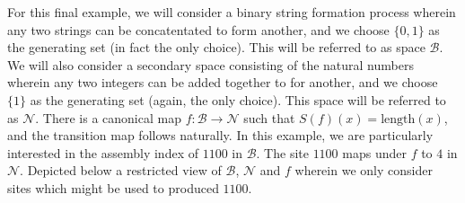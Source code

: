 \documentclass[aps,prd,onecolumn,nofootinbib,letterpaper,preprintnumbers,superscriptaddress,eqsecnum]{revtex4}
\theoremstyle{definition}
\begin{document}
For this final example, we will consider a binary string formation process wherein any two strings can be concatentated to form another, and we choose $\{0, 1\}$ as the generating set (in fact the only choice).
This will be referred to as space $\mathcal{B}$.
We will also consider a secondary space consisting of the natural numbers wherein any two integers can be added together to for another, and we choose $\{1\}$ as the generating set (again, the only choice).
This space will be referred to as $\mathcal{N}$.
There is a canonical map $f : \mathcal{B} \rightarrow \mathcal{N}$ such that $S(f)(x) = \textrm{length}(x)$, and the transition map follows naturally.
In this example, we are particularly interested in the assembly index of $1100$ in $\mathcal{B}$.
The site $1100$ maps under $f$ to $4$ in $\mathcal{N}$.
Depicted below a restricted view of $\mathcal{B}$, $\mathcal{N}$ and $f$ wherein we only consider sites which might be used to produced $1100$.
\end{document}
